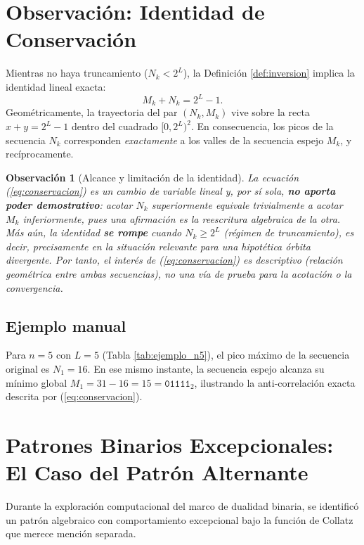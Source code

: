 \documentclass[11pt,a4paper]{article}
\newtheorem{remark}[theorem]{Observación}
\begin{document}
\section{Observación: Identidad de Conservación}
\label{sec:conservacion}

Mientras no haya truncamiento ($N_k < 2^L$), la Definición \ref{def:inversion} implica la identidad lineal exacta:
\begin{equation}
    M_k + N_k = 2^L - 1.
    \label{eq:conservacion}
\end{equation}
Geométricamente, la trayectoria del par $(N_k, M_k)$ vive sobre la recta $x+y = 2^L-1$ dentro del cuadrado $[0, 2^L)^2$. En consecuencia, los picos de la secuencia $N_k$ corresponden \emph{exactamente} a los valles de la secuencia espejo $M_k$, y recíprocamente.

\begin{remark}[Alcance y limitación de la identidad]
La ecuación (\ref{eq:conservacion}) es un cambio de variable lineal y, por sí sola, \textbf{no aporta poder demostrativo}: acotar $N_k$ superiormente equivale trivialmente a acotar $M_k$ inferiormente, pues una afirmación es la reescritura algebraica de la otra. Más aún, la identidad \textbf{se rompe} cuando $N_k \ge 2^L$ (régimen de truncamiento), es decir, precisamente en la situación relevante para una hipotética órbita divergente. Por tanto, el interés de (\ref{eq:conservacion}) es \emph{descriptivo} (relación geométrica entre ambas secuencias), no una vía de prueba para la acotación o la convergencia.
\end{remark}

\subsection{Ejemplo manual}
Para $n=5$ con $L=5$ (Tabla \ref{tab:ejemplo_n5}), el pico máximo de la secuencia original es $N_1 = 16$. En ese mismo instante, la secuencia espejo alcanza su mínimo global $M_1 = 31 - 16 = 15 = \mathtt{01111}_2$, ilustrando la anti-correlación exacta descrita por (\ref{eq:conservacion}).

\section{Patrones Binarios Excepcionales: El Caso del Patrón Alternante}
\label{sec:patron_alternante}

Durante la exploración computacional del marco de dualidad binaria, se identificó un patrón algebraico con comportamiento excepcional bajo la función de Collatz que merece mención separada.
\end{document}
